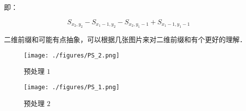 即：

\begin{equation}
S_{x_2, y_2} - S_{x_1 - 1, y_2} - S_{x_2, y_1 - 1} + S_{x_1 - 1, y_1 - 1}
\end{equation}

二维前缀和可能有点抽象，可以根据几张图片来对二维前缀和有个更好的理解．

\begin{figure}[ht]
\centering
\texttt{[image: ./figures/PS\_2.png]}
\caption{预处理 $1$} \label{PS_fig2}
\end{figure}


\begin{figure}[ht]
\centering
\texttt{[image: ./figures/PS\_1.png]}
\caption{预处理 $2$ } \label{PS_fig1}
\end{figure}

